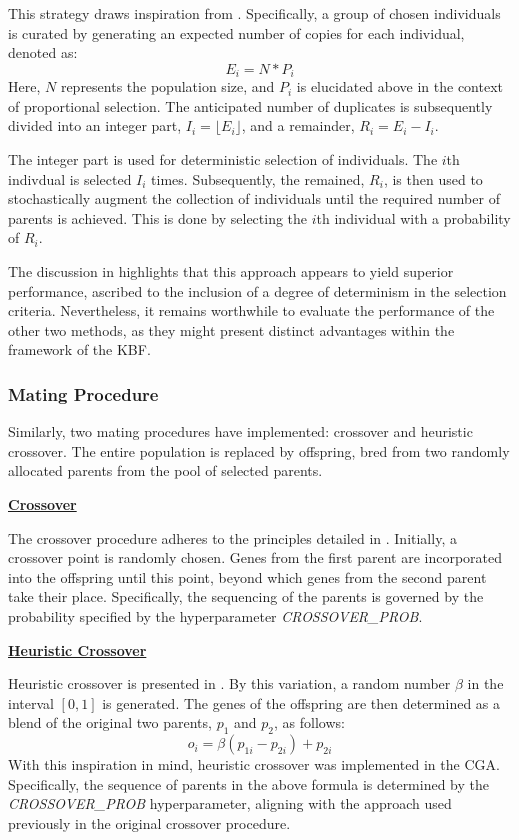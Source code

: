 \documentclass[10pt]{article}
\begin{document}
\begin{multicols}{2}
This strategy draws inspiration from \cite{parks2023geneticalgorithms}. Specifically, a group of chosen individuals is curated by generating an expected number of copies for each individual, denoted as: 
\[E_i = N * P_i\]
Here, \(N\) represents the population size, and \(P_i\) is elucidated above in the context of proportional selection. The anticipated number of duplicates is subsequently divided into an integer part, \(I_i = \lfloor E_i \rfloor\), and a remainder, \(R_i = E_i - I_i\). 

The integer part is used for deterministic selection of individuals. The $i$th indivdual is selected $I_i$ times. Subsequently, the remained, $R_i$, is then used to stochastically augment the collection of individuals until the required number of parents is achieved. This is done by selecting the $i$th individual with a probability of $R_i$.

The discussion in \cite{parks2023geneticalgorithms} highlights that this approach appears to yield superior performance, ascribed to the inclusion of a degree of determinism in the selection criteria. Nevertheless, it remains worthwhile to evaluate the performance of the other two methods, as they might present distinct advantages within the framework of the KBF.

\subsubsection{Mating Procedure}

Similarly, two mating procedures have implemented: crossover and heuristic crossover. The entire population is replaced by offspring, bred from two randomly allocated parents from the pool of selected parents.

\textbf{\underline{Crossover}}

The crossover procedure adheres to the principles detailed in \cite{parks2023geneticalgorithms}. Initially, a crossover point is randomly chosen. Genes from the first parent are incorporated into the offspring until this point, beyond which genes from the second parent take their place. Specifically, the sequencing of the parents is governed by the probability specified by the hyperparameter \textit{CROSSOVER\_PROB}.

\textbf{\underline{Heuristic Crossover}}

Heuristic crossover is presented in \cite{Michalewicz_2011}. By this variation, a random number $\beta$ in the interval $[0, 1]$ is generated. The genes of the offspring are then determined as a blend of the original two parents, $p_1$ and $p_2$, as follows:
\[
    o_i = \beta (p_{1i} - p_{2i}) + p_{2i}
\]
With this inspiration in mind, heuristic crossover was implemented in the CGA. Specifically, the sequence of parents in the above formula is determined by the \textit{CROSSOVER\_PROB} hyperparameter, aligning with the approach used previously in the original crossover procedure.


\end{multicols}
\end{document}
